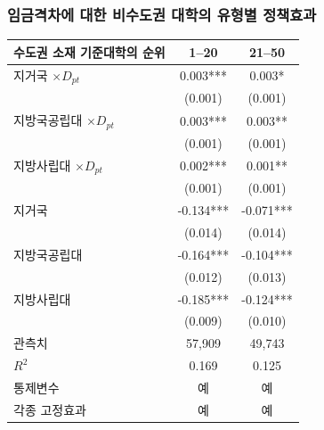 \documentclass[aspectratio=169,xcolor=dvipsnames,handout]{beamer}
\begin{document}
\begin{frame}
    \frametitle{임금격차에 대한 비수도권 대학의 유형별 정책효과}
    \begin{table}[ht]
        \tiny
        \centering
        \begin{tabular}{lcc}
        \toprule
        \midrule
        수도권 소재 기준대학의 순위    & 1--20     & 21--50    \\
        \midrule                                                             
        지거국 $\times D_{pt}$                         & 0.003***  & 0.003*    \\
                                                     & (0.001)   & (0.001)   \\
        지방국공립대 $\times D_{pt}$  & 0.003***  & 0.003**   \\
                                                     & (0.001)   & (0.001)   \\
        지방사립대 $\times D_{pt}$ & 0.002***  & 0.001**   \\
                                                     & (0.001)   & (0.001)   \\
        지거국                                         & -0.134*** & -0.071*** \\
                                                     & (0.014)   & (0.014)   \\
        지방국공립대                  & -0.164*** & -0.104*** \\
                                                     & (0.012)   & (0.013)   \\
        지방사립대                 & -0.185*** & -0.124*** \\
                                                     & (0.009)   & (0.010)   \\
        \midrule                                                             
        관측치                                 & 57,909    & 49,743    \\
        $R^2$                                    & 0.169     & 0.125     \\
        통제변수                                     & 예       & 예       \\
        각종 고정효과                                          & 예       & 예       \\
        \bottomrule
        \end{tabular}
    \end{table}
\end{frame}
\end{document}
